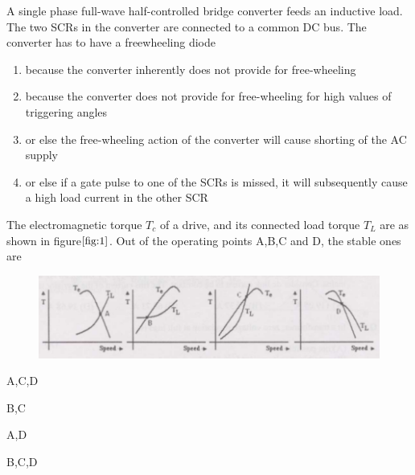     \item A single phase full-wave half-controlled bridge converter feeds an inductive load. The two SCRs in the converter are connected to a common DC bus. The converter has to have a freewheeling diode 
    \begin{enumerate}
            \item because the converter inherently does not provide for free-wheeling
            \item because the converter does not provide for free-wheeling for high values of triggering angles
             \item or else the free-wheeling action of the converter will cause shorting of the AC supply
            \item or else if a gate pulse  to one of the SCRs is missed, it will subsequently cause a high load current in the other SCR
    \end{enumerate}
    \bigskip
\item The electromagnetic torque $T_c$ of a drive, and its connected load torque $T_L$ are as shown in figure$\ref{fig:1}$. Out of the operating points A,B,C and D, the stable ones are
\begin{figure}[!ht]
    \centering
    \includegraphics[width=\linewidth]{GATE-yearwise/Assignment2/figs/1.png}
    \caption{}
    \label{fig:1}
    \end{figure}
\begin{enumerate}
    \begin{multicols}{4}
        \item A,C,D
        \item B,C
        \item A,D
        \item B,C,D
    \end{multicols}
\end{enumerate}
